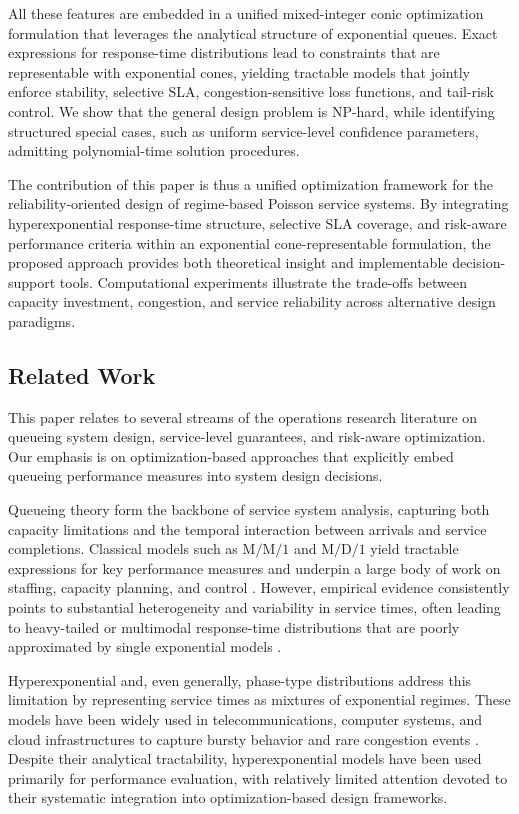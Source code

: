 \documentclass[letter,11pt, reqno]{amsart}
\begin{document}
All these features are embedded in a unified mixed-integer conic optimization formulation
that leverages the analytical structure of exponential queues.
Exact expressions for response-time distributions lead to constraints that are
representable with exponential cones, yielding tractable models that jointly
enforce stability, selective SLA, congestion-sensitive loss functions,
and tail-risk control.
We show that the general design problem is NP-hard, while identifying
structured special cases, such as uniform service-level confidence parameters, admitting
polynomial-time solution procedures.

The contribution of this paper is thus a unified optimization framework for
the reliability-oriented design of regime-based Poisson service systems.
By integrating hyperexponential response-time structure, selective SLA
coverage, and risk-aware performance criteria within an exponential cone-representable formulation, the proposed approach provides both theoretical
insight and implementable decision-support tools.
Computational experiments illustrate the trade-offs between capacity
investment, congestion, and service reliability across alternative design
paradigms.

\subsection{Related Work}

This paper relates to several streams of the operations research literature on
queueing system design, service-level guarantees, and risk-aware optimization.
Our emphasis is on optimization-based approaches that explicitly embed queueing
performance measures into system design decisions.

Queueing theory form the backbone of service system analysis, capturing both
capacity limitations and the temporal interaction between arrivals and service
completions.
Classical models such as $\mathrm{M}/\mathrm{M}/1$ and $\mathrm{M}/\mathrm{D}/1$
yield tractable expressions for key performance measures and underpin a large
body of work on staffing, capacity planning, and control
\citep{Gross2008}.
However, empirical evidence consistently points to substantial heterogeneity and
variability in service times, often leading to heavy-tailed or multimodal
response-time distributions that are poorly approximated by single exponential
models \citep{hokstad78}.

Hyperexponential and, even generally, phase-type distributions address this
limitation by representing service times as mixtures of exponential regimes.
These models have been widely used in telecommunications, computer systems, and
cloud infrastructures to capture bursty behavior and rare congestion events
\citep{Asmussen2003,FeldmannWhitt1998}.
Despite their analytical tractability, hyperexponential models have been used
primarily for performance evaluation, with relatively limited attention devoted
to their systematic integration into optimization-based design frameworks.
\end{document}
